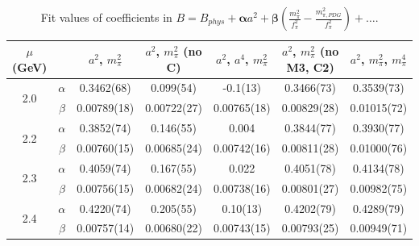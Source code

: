 \documentclass[12pt]{extarticle}
\begin{document}
\begin{table}[h!]
\begin{center}
\begin{tabular}{|c c|c|c|c|c|c|}
\hline
$\mu$ (GeV) &  & $a^2$, $m_\pi^2$& $a^2$, $m_\pi^2$ (no C)& $a^2$, $a^4$, $m_\pi^2$& $a^2$, $m_\pi^2$ (no M3, C2)& $a^2$, $m_\pi^2$, $m_\pi^4$\\
\hline
\multirow{2}{0.5in}{2.0} & $\alpha$ & 0.3462(68)& 0.099(54)& -0.1(13)& 0.3466(73)& 0.3539(73)\\
 & $\beta$ & 0.00789(18)& 0.00722(27)& 0.00765(18)& 0.00829(28)& 0.01015(72)\\
\hline
\multirow{2}{0.5in}{2.2} & $\alpha$ & 0.3852(74)& 0.146(55)& 0.004& 0.3844(77)& 0.3930(77)\\
 & $\beta$ & 0.00760(15)& 0.00685(24)& 0.00742(16)& 0.00811(28)& 0.01000(76)\\
\hline
\multirow{2}{0.5in}{2.3} & $\alpha$ & 0.4059(74)& 0.167(55)& 0.022& 0.4051(78)& 0.4134(78)\\
 & $\beta$ & 0.00756(15)& 0.00682(24)& 0.00738(16)& 0.00801(27)& 0.00982(75)\\
\hline
\multirow{2}{0.5in}{2.4} & $\alpha$ & 0.4220(74)& 0.205(55)& 0.10(13)& 0.4202(79)& 0.4289(79)\\
 & $\beta$ & 0.00757(14)& 0.00680(22)& 0.00743(15)& 0.00793(25)& 0.00949(71)\\
\hline
\end{tabular}
\caption{Fit values of coefficients in $B = B_{phys} + \mathbf{\alpha} a^2 + \mathbf{\beta}\left(\frac{m_\pi^2}{f_\pi^2}-\frac{m_{\pi,PDG}^2}{f_\pi^2}\right) + \ldots$.}
\end{center}
\end{table}




















\clearpage
\end{document}
